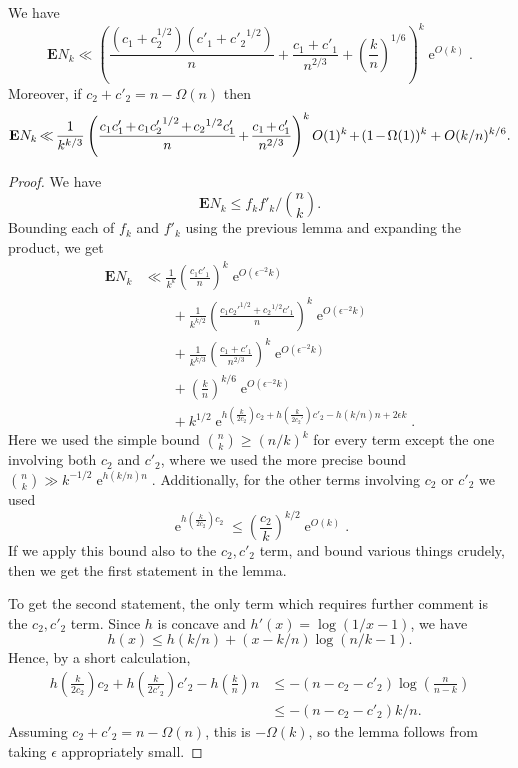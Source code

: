 \documentclass[ALCO,ThmDefs,Unicode,epreuves]{cedram}
\DeclareMathOperator{\expe}{e}
\newcommand{\eps}{\epsilon}
\newcommand\E{\mathbf{E}}
\newcommand\br[1]{\left({#1}\right)}
\newcommand\pfrac[2]{\br{\frac{#1}{#2}}}
\newcommand*{\Mk}{\mkern -2mu}
\begin{document}
\begin{lemma} \label{lem:Nk-bound-small-k}
We have
\[
 \E N_k \ll \left(
 \frac{(c_1 + c_2^{1/2}) (c'_1 + {c'_2}^{1/2})}{n} + \frac{c_1 + c'_1}{n^{2/3}} + \pfrac{k}{n}^{1/6}
 \right)^k \expe^{O(k)}.
\]
Moreover, if $c_2 + c'_2 = n - \Omega(n)$ then
\begin{align*}
 \E N_k
 \Mk \ll \Mk \frac1{k^{k/3}}
 \left(
 \frac{ c_1 c'_1 \Mk +\Mk c_1 {c'_2}^{1/2} \Mk +\Mk {c_2}^{1/2} c'_1}{n} \Mk +\Mk \frac{c_1 \Mk +\Mk c'_1}{n^{2/3}}
 \right)^k O(1)^k %
 \Mk +\Mk (1 \Mk -\Mk \Omega(1))^k + O(k/n)^{k/6}.
\end{align*}
\end{lemma}
\begin{proof}
We have
\[
 \E N_k \leq f_k f'_k / \binom{n}{k}.
\]
Bounding each of $f_k$ and $f'_k$ using the previous lemma and expanding the product, we get
\begin{align*}
 \E N_k 
 &\ll \frac1{k^k} \pfrac{c_1 c'_1}{n}^k \expe^{O(\eps^{-2} k)} \\
 &\qquad + \frac1{k^{k/2}} \pfrac{c_1 {c_2'}^{1/2} + {c_2}^{1/2} c'_1}{n}^k \expe^{O(\eps^{-2} k)} \\
 &\qquad + \frac1{k^{k/3}} \left(\frac{c_1 + c'_1}{n^{2/3}} \right)^k \expe^{O(\eps^{-2} k)} \\
 &\qquad + \left(\frac{k}{n} \right)^{k/6} \expe^{O(\eps^{-2} k)} \\
 &\qquad + k^{1/2} \expe^{h\left(\frac{k}{2c_2}\right) c_2 + h\left(\frac{k}{2c_2'}\right)c'_2 - h(k/n)n + 2 \eps k}.
\end{align*}
Here we used the simple bound $\binom{n}{k} \geq (n/k)^k$ for every term except the one involving both $c_2$ and $c'_2$, where we used the more precise bound $\binom{n}{k} \gg k^{-1/2} \expe^{h(k/n) n}$. Additionally, for the other terms involving $c_2$ or $c'_2$ we used
\[
 \expe^{h\pfrac{k}{2c_2}c_2} \leq \pfrac{c_2}{k}^{k/2} \expe^{O(k)}.
\]
If we apply this bound also to the $c_2, c'_2$ term, and bound various things crudely, then we get the first statement in the lemma.

To get the second statement, the only term which requires further comment is the $c_2, c'_2$ term. Since $h$ is concave and $h'(x) = \log(1/x - 1)$, we have
\[
 h(x) \leq h(k/n) + (x - k/n) \log(n/k - 1).
\]
Hence, by a short calculation,
\begin{align*}
 h\pfrac{k}{2c_2} c_2 + h\pfrac{k}{2c'_2} c'_2 - h\pfrac{k}{n} n
 &\leq -(n - c_2 - c'_2) \log \pfrac{n}{n-k} \\
 &\leq -(n - c_2 - c'_2) k/n.
\end{align*}
Assuming $c_2 + c'_2 = n - \Omega(n)$, this is $-\Omega(k)$, so the lemma follows from taking $\eps$ appropriately small.
\end{proof}
\end{document}
